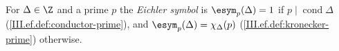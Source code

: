 For $\Delta\in\Z$ and a prime $p$ the \emph{Eichler symbol} is $\esym_p(\Delta)=1$ if $p\mid\operatorname{cond}\Delta$
(\cref{III.ef.def:conductor-prime}), and $\esym_p(\Delta)=\chi_\Delta(p)$ (\cref{III.ef.def:kronecker-prime}) otherwise.
